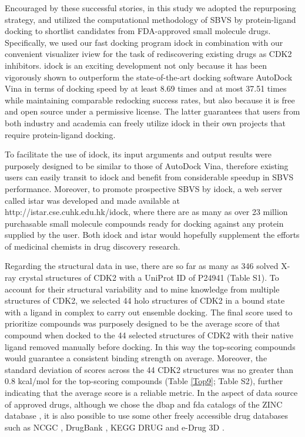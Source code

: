\documentclass[10pt]{article}
\begin{document}
Encouraged by these successful stories, in this study we adopted the repurposing strategy, and utilized the computational methodology of SBVS by protein-ligand docking to shortlist candidates from FDA-approved small molecule drugs. Specifically, we used our fast docking program idock \cite{1153,1362} in combination with our convenient visualizer iview \cite{1366} for the task of rediscovering existing drugs as CDK2 inhibitors. idock is an exciting development not only because it has been vigorously shown \cite{1362} to outperform the state-of-the-art docking software AutoDock Vina \cite{595} in terms of docking speed by at least 8.69 times and at most 37.51 times while maintaining comparable redocking success rates, but also because it is free and open source under a permissive license. The latter guarantees that users from both industry and academia can freely utilize idock in their own projects that require protein-ligand docking.

To facilitate the use of idock, its input arguments and output results were purposely designed to be similar to those of AutoDock Vina, therefore existing users can easily transit to idock and benefit from considerable speedup in SBVS performance. Moreover, to promote prospective SBVS by idock, a web server called istar \cite{1362} was developed and made available at http://istar.cse.cuhk.edu.hk/idock, where there are as many as over 23 million purchasable small molecule compounds ready for docking against any protein supplied by the user. Both idock \cite{1153} and istar \cite{1362} would hopefully supplement the efforts of medicinal chemists in drug discovery research.

Regarding the structural data in use, there are so far as many as 346 solved X-ray crystal structures of CDK2 with a UniProt ID of P24941 (Table S1). To account for their structural variability and to mine knowledge from multiple structures of CDK2, we selected 44 holo structures of CDK2 in a bound state with a ligand in complex to carry out ensemble docking. The final score used to prioritize compounds was purposely designed to be the average score of that compound when docked to the 44 selected structures of CDK2 with their native ligand removed manually before docking. In this way the top-scoring compounds would guarantee a consistent binding strength on average. Moreover, the standard deviation of scores across the 44 CDK2 structures was no greater than 0.8 kcal/mol for the top-scoring compounds (Table \ref{Top9}; Table S2), further indicating that the average score is a reliable metric. In the aspect of data source of approved drugs, although we chose the dbap and fda catalogs of the ZINC database \cite{532,1178}, it is also possible to use some other freely accessible drug databases such as NCGC \cite{1608}, DrugBank \cite{1594}, KEGG DRUG \cite{1595} and e-Drug 3D \cite{1125}.
\end{document}
